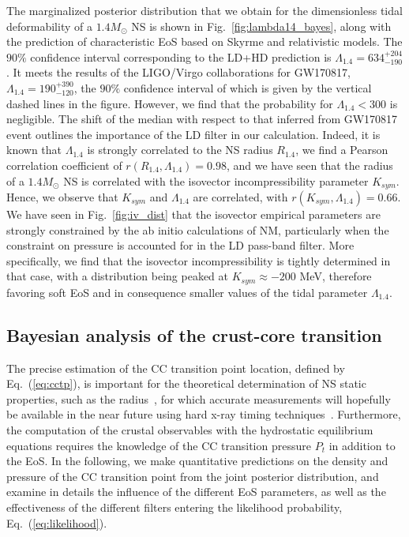 The marginalized posterior distribution that we obtain for the dimensionless 
tidal deformability of a $1.4M_\odot$ NS is shown in 
Fig.~\ref{fig:lambda14_bayes}, along with the prediction of characteristic EoS
based on Skyrme and relativistic models. The $90\%$ confidence interval
corresponding to the LD+HD prediction is $\Lambda_{1.4}=634_{-190}^{+204}$. It 
meets the results of the LIGO/Virgo collaborations for GW170817, 
$\Lambda_{1.4}=190_{-120}^{+390}$, the $90\%$ confidence interval of which is 
given by the vertical dashed lines in the figure. 
However, we find that the probability for $\Lambda_{1.4} < 300$ is 
negligible. The shift of the median with respect to that inferred from
GW170817 event outlines the importance of the LD filter in our calculation.
Indeed, it is known that $\Lambda_{1.4}$ is strongly correlated to the NS
radius $R_{1.4}$, we find a Pearson correlation coefficient of $r(R_{1.4},
\Lambda_{1.4})=0.98$, and we have seen that the radius of a $1.4M_\odot$ NS is 
correlated with the isovector incompressibility parameter $K_{sym}$. Hence, 
we observe that $K_{sym}$ and $\Lambda_{1.4}$ are correlated, with
$r(K_{sym},\Lambda_{1.4}) = 0.66$. We have seen in Fig.~\ref{fig:iv_dist} that 
the isovector empirical parameters are strongly constrained by the ab initio 
calculations of NM, particularly when the constraint on pressure is accounted 
for in the LD pass-band filter. More specifically, we find that the 
isovector incompressibility is tightly determined in that case, with a 
distribution being peaked at $K_{sym} \approx -200$ MeV, therefore favoring 
soft EoS and in consequence smaller values of the tidal parameter 
$\Lambda_{1.4}$.
%


\subsection{Bayesian analysis of the crust-core
transition}\label{subsec:cc_bayes}

The precise estimation of the CC transition point location, defined by
Eq.~(\ref{eq:cctp}), is important for the theoretical determination of NS 
static properties, such as the radius~\cite{Fortin2016}, for which accurate 
measurements will hopefully be available in the near future using hard x-ray 
timing techniques~\cite{Watts2016}. 
Furthermore, the computation of the crustal observables with the hydrostatic 
equilibrium equations requires the knowledge of the CC transition pressure 
$P_t$ in addition to the EoS. 
In the following, we make quantitative predictions on the density and
pressure of the CC transition point from the joint posterior distribution, and 
examine in details the influence of the different EoS parameters, as well as 
the effectiveness of the different filters entering the likelihood 
probability, Eq.~(\ref{eq:likelihood}).

